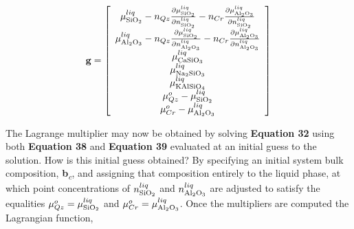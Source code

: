 \documentclass[11pt, titlepage, twoside]{article}
\begin{document}
\begin{MPEquation}[!ht]
\begin{equation}
{\bf{g}} = \left[ {\begin{array}{*{20}{c}}
{\mu _{{\rm{Si}}{{\rm{O}}_2}}^{liq} - {n_{Qz}}\frac{{\partial \mu _{{\rm{Si}}{{\rm{O}}_2}}^{liq}}}{{\partial n_{{\rm{Si}}{{\rm{O}}_2}}^{liq}}} - {n_{Cr}}\frac{{\partial \mu _{{\rm{A}}{{\rm{l}}_2}{{\rm{O}}_3}}^{liq}}}{{\partial n_{{\rm{Si}}{{\rm{O}}_2}}^{liq}}}}\\
{\mu _{{\rm{A}}{{\rm{l}}_2}{{\rm{O}}_3}}^{liq} - {n_{Qz}}\frac{{\partial \mu _{{\rm{Si}}{{\rm{O}}_2}}^{liq}}}{{\partial n_{{\rm{A}}{{\rm{l}}_2}{{\rm{O}}_3}}^{liq}}} - {n_{Cr}}\frac{{\partial \mu _{{\rm{A}}{{\rm{l}}_2}{{\rm{O}}_3}}^{liq}}}{{\partial n_{{\rm{A}}{{\rm{l}}_2}{{\rm{O}}_3}}^{liq}}}}\\
{\mu _{{\rm{CaSi}}{{\rm{O}}_3}}^{liq}}\\
{\mu _{{\rm{N}}{{\rm{a}}_2}{\rm{Si}}{{\rm{O}}_3}}^{liq}}\\
{\mu _{{\rm{KAlSi}}{{\rm{O}}_4}}^{liq}}\\
{\mu _{Qz}^o - \mu _{{\rm{Si}}{{\rm{O}}_2}}^{liq}}\\
{\mu _{Cr}^o - \mu _{{\rm{A}}{{\rm{l}}_2}{{\rm{O}}_3}}^{liq}}
\end{array}} \right]
\end{equation}
\label{MPEquationElement:7BDAED01-2278-4F11-D0AA-1CF3EDF6183B}
\end{MPEquation}
The Lagrange multiplier may now be obtained by solving \textbf{Equation 32} using both \textbf{Equation 38} and \textbf{Equation 39} evaluated at an initial guess to the solution. How is this initial guess obtained? By specifying an initial system bulk composition, \textbf{b}\emph{\textsubscript{c}}, and assigning that composition entirely to the liquid phase, at which point concentrations of $n_{{\rm{Si}}{{\rm{O}}_2}}^{liq}$ and $n_{{\rm{A}}{{\rm{l}}_2}{{\rm{O}}_3}}^{liq}$ are adjusted to satisfy the equalities $\mu _{Qz}^o = \mu _{{\rm{Si}}{{\rm{O}}_2}}^{liq}$ and $\mu _{Cr}^o = \mu _{{\rm{A}}{{\rm{l}}_2}{{\rm{O}}_3}}^{liq}$. Once the multipliers are computed the Lagrangian function,
\end{document}
